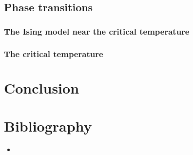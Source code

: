 \documentclass[a4paper, twoside, 11pt]{report}
\theoremstyle{theorem}
\theoremstyle{remark}
\theoremstyle{exemple}
\begin{document}
    \section{Phase transitions}
    
        \subsection{The Ising model near the critical temperature}
        
        \subsection{The critical temperature}



\chapter*{Conclusion}

    \paragraph{}
    

\chapter*{Bibliography}
    
    \begin{itemize}
        \item
    \end{itemize}
    
\end{document}
